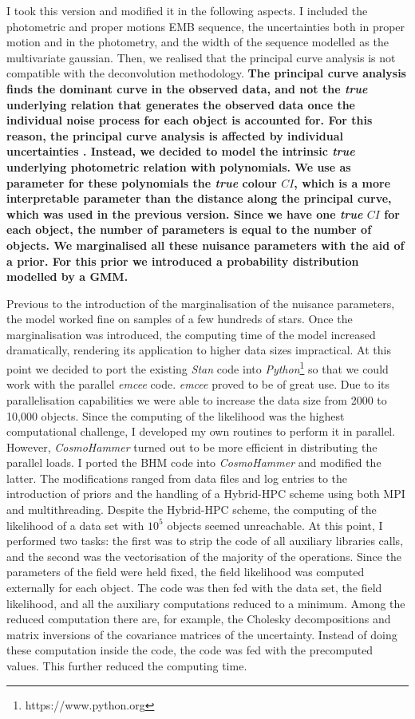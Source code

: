 I took this version and modified it in the following aspects. I included the photometric and proper motions EMB sequence, the uncertainties both in proper motion and in the photometry, and the width of the sequence modelled as the multivariate gaussian. Then, we realised that the principal curve analysis is not compatible with the deconvolution methodology. \textbf{The principal curve analysis finds the dominant curve in the observed data, and not the \emph{true} underlying relation that generates the observed data once the individual noise process for each object is accounted for. For this reason, the principal curve analysis is affected by individual uncertainties \cite[see][for the negative impact of heteroscedastic data on the related principal component analysis]{Hong2016}. Instead, we decided to model the intrinsic \emph{true} underlying photometric relation with polynomials. We use as parameter for these polynomials the \emph{true} colour $CI$, which is a more interpretable parameter than the distance along the principal curve, which was used in the previous version. Since we have one \emph{true} $CI$ for each object, the number of parameters is equal to the number of objects. We marginalised all these nuisance parameters with the aid of a prior. For this prior we introduced a probability distribution modelled by a GMM.}

Previous to the introduction of the marginalisation of the nuisance parameters, the model worked fine on samples of a few hundreds of stars. Once the marginalisation was introduced, the computing time of the model increased dramatically, rendering its application to higher data sizes impractical. At this point we decided to port the existing \emph{Stan} code into \emph
{Python}\footnote{https://www.python.org} so that we could work with the parallel \emph{emcee} code. \emph{emcee} proved to be of great use. Due to its parallelisation capabilities we were able to increase the data size from 2000 to 10,000 objects. Since the computing of the likelihood was the highest computational challenge, I developed my own routines to perform it in parallel. However, \emph{CosmoHammer} \citep{Akeret2013} turned out to be more efficient in distributing the parallel loads. I ported the BHM code into \emph{CosmoHammer} and modified the latter. The modifications ranged from data files and log entries to the introduction of priors and the handling of a Hybrid-HPC scheme using both MPI and multithreading. Despite the Hybrid-HPC scheme, the computing of the likelihood of a data set with $10^5$ objects seemed unreachable. At this point, I performed two tasks: the first was to strip the code of all auxiliary libraries calls, and the second was the vectorisation of the majority of the operations. Since the parameters of the field were held fixed, the field likelihood was computed externally for each object. The code was then fed with the data set, the field likelihood, and all the auxiliary computations reduced to a minimum. Among the reduced computation there are, for example, the Cholesky decompositions and matrix inversions of the covariance matrices of the uncertainty. Instead of doing these computation inside the code, the code was fed with the precomputed values. This further reduced the computing time.

